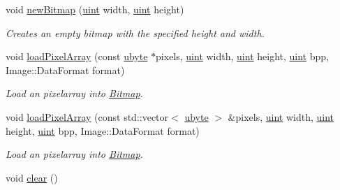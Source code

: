\begin{DoxyCompactItemize}
void \hyperlink{class_f2_c_1_1_bitmap_aaec3a71bd846e0570c62d34bd2d4b80c}{newBitmap} (\hyperlink{namespace_f2_c_a58be2bac9eb3e3c99cb41b6008bf4fae}{uint} width, \hyperlink{namespace_f2_c_a58be2bac9eb3e3c99cb41b6008bf4fae}{uint} height)
\begin{DoxyCompactList}\small\item\em Creates an empty bitmap with the specified height and width. \item\end{DoxyCompactList}\item 
void \hyperlink{class_f2_c_1_1_bitmap_ad8854f706211292b72ee7ab29f50367f}{loadPixelArray} (const \hyperlink{namespace_f2_c_a74fad364688add30796d711e5635ac77}{ubyte} $\ast$pixels, \hyperlink{namespace_f2_c_a58be2bac9eb3e3c99cb41b6008bf4fae}{uint} width, \hyperlink{namespace_f2_c_a58be2bac9eb3e3c99cb41b6008bf4fae}{uint} height, \hyperlink{namespace_f2_c_a58be2bac9eb3e3c99cb41b6008bf4fae}{uint} bpp, Image::DataFormat format)
\begin{DoxyCompactList}\small\item\em Load an pixelarray into \hyperlink{class_f2_c_1_1_bitmap}{Bitmap}. \item\end{DoxyCompactList}\item 
void \hyperlink{class_f2_c_1_1_bitmap_ae707e2e499d1bc72465be4ac739bccfa}{loadPixelArray} (const std::vector$<$ \hyperlink{namespace_f2_c_a74fad364688add30796d711e5635ac77}{ubyte} $>$ \&pixels, \hyperlink{namespace_f2_c_a58be2bac9eb3e3c99cb41b6008bf4fae}{uint} width, \hyperlink{namespace_f2_c_a58be2bac9eb3e3c99cb41b6008bf4fae}{uint} height, \hyperlink{namespace_f2_c_a58be2bac9eb3e3c99cb41b6008bf4fae}{uint} bpp, Image::DataFormat format)
\begin{DoxyCompactList}\small\item\em Load an pixelarray into \hyperlink{class_f2_c_1_1_bitmap}{Bitmap}. \item\end{DoxyCompactList}\item 
\hypertarget{class_f2_c_1_1_bitmap_a813d77416c70e0030659a67d490d29e0}{
void \hyperlink{class_f2_c_1_1_bitmap_a813d77416c70e0030659a67d490d29e0}{clear} ()}
\label{class_f2_c_1_1_bitmap_a813d77416c70e0030659a67d490d29e0}


\end{DoxyCompactItemize}
